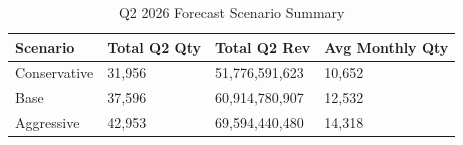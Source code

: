 \begin{table}[hbt!]
\centering
\caption{Q2 2026 Forecast Scenario Summary}
\label{tab:scenario_summary}
\begin{tabular}{@{} llll @{}}
\toprule
\textbf{Scenario} & \textbf{Total Q2 Qty} & \textbf{Total Q2 Rev} & \textbf{Avg Monthly Qty} \\
\midrule
Conservative & 31,956 & 51,776,591,623 & 10,652 \\
Base & 37,596 & 60,914,780,907 & 12,532 \\
Aggressive & 42,953 & 69,594,440,480 & 14,318 \\
\bottomrule
\end{tabular}
\end{table}
